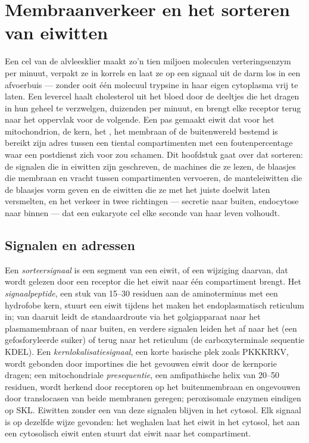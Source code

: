 \chapter{Membraanverkeer en het sorteren van eiwitten}\label{ch:b3:membrane-traffic}

Een cel van de alvleesklier maakt zo'n tien miljoen moleculen
verteringsenzym per minuut, verpakt ze in korrels en laat ze op een
signaal uit de darm los in een afvoerbuis --- zonder ooit één molecuul
trypsine in haar eigen cytoplasma vrij te laten. Een levercel haalt
cholesterol uit het bloed door de deeltjes die het dragen in hun geheel
te verzwelgen, duizenden per minuut, en brengt elke receptor terug naar
het oppervlak voor de volgende. Een pas gemaakt eiwit dat voor het
mitochondrion, de kern, het , het membraan of de buitenwereld
bestemd is bereikt zijn adres tussen een tiental compartimenten met een
foutenpercentage waar een postdienst zich voor zou schamen. Dit
hoofdstuk gaat over dat sorteren: de signalen die in eiwitten zijn
geschreven, de machines die ze lezen, de blaasjes die membraan en
vracht tussen compartimenten vervoeren, de manteleiwitten die de
blaasjes vorm geven en de eiwitten die ze met het juiste doelwit laten
versmelten, en het verkeer in twee richtingen --- secretie naar buiten,
endocytose naar binnen --- dat een eukaryote cel elke seconde van haar
leven volhoudt.

\section{Signalen en adressen}

\begin{definition}[Sorteersignalen]\label{def:b3:membrane-traffic:signals}
Een \emph{sorteersignaal} is een segment van een eiwit, of een
wijziging daarvan, dat wordt gelezen door een receptor die het eiwit
naar één compartiment brengt. Het \emph{signaalpeptide}, een stuk van
\numrange{15}{30} residuen aan de aminoterminus met een hydrofobe kern,
stuurt een eiwit tijdens het maken het endoplasmatisch reticulum in;
van daaruit leidt de standaardroute via het golgiapparaat naar het
plasmamembraan of naar buiten, en verdere signalen leiden het af naar
het  (een gefosforyleerde suiker) of terug naar het reticulum
(de carboxyterminale sequentie KDEL). Een
\emph{kernlokalisatiesignaal}, een korte basische plek zoals PKKKRKV,
wordt gebonden door importines die het gevouwen eiwit door de kernporie
dragen; een mitochondriale \emph{presequentie}, een amfipathische helix
van \numrange{20}{50} residuen, wordt herkend door receptoren op het
buitenmembraan en ongevouwen door translocasen van beide membranen
geregen; peroxisomale enzymen eindigen op SKL. Eiwitten zonder een van
deze signalen blijven in het cytosol. Elk signaal is op dezelfde wijze
gevonden: het weghalen laat het eiwit in het cytosol, het aan een
cytosolisch eiwit enten stuurt dat eiwit naar het compartiment.
\end{definition}

